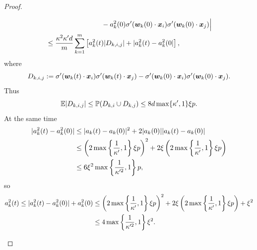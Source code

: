 \documentclass[twoside,11pt]{article}
\begin{document}
\begin{proof}
\begin{enumerate}[(a)]
\begin{enumerate}[(i)]
\begin{equation*}
\begin{aligned}
                                 & \quad\quad\quad\quad\quad\quad\quad\quad -a_k^2(0)\sigma'(\bm{w}_k(0)\cdot\bm{x}_i)\sigma'(\bm{w}_k(0)\cdot\bm{x}_j)\Big|                        \\
                                 & \leq \frac{\kappa^2\kappa'd}{m}\sum_{k=1}^m\left[a_k^2(t)\lvert D_{k,i,j}\rvert+|a_k^2(t)-a_k^2(0|\right],
                            \end{aligned}
                        \end{equation*}
                        where
                        \begin{equation*}
                            D_{k,i,j}:=\sigma'(\bm{w}_k(t)\cdot\bm{x}_i)\sigma'(\bm{w}_k(t)\cdot\bm{x}_j)-\sigma'(\bm{w}_k(0)\cdot\bm{x}_i)\sigma'(\bm{w}_k(0)\cdot\bm{x}_j).
                        \end{equation*}
                        Thus
                        \begin{equation*}
                            \mathbb{E}|D_{k,i,j}|\leq\mathbb{P}(D_{k,i}\cup D_{k,j})\leq 8d\max\{\kappa',1\}\xi p.
                        \end{equation*}
                        At the same time
                        \begin{equation*}
                            \begin{aligned}
                                \lvert a_k^2(t)-a_k^2(0)\rvert
                                 & \leq\lvert a_k(t)-a_k(0)\rvert^2+2\lvert a_k(0)\rvert\lvert a_k(t)-a_k(0)\rvert                                                                     \\
                                 & \leq \left(2\max\left\{\frac{1}{\kappa'},1\right\}\xi p\right)^2+2\xi\left(2\max\left\{\frac{1}{\kappa'},1\right\}\xi p\right) \\
                                 & \leq 6\xi^2\max\left\{\frac{1}{\kappa'^2},1\right\}p,
                            \end{aligned}
                        \end{equation*}
                        so
                        \begin{equation*}
                            \begin{aligned}
                                a_k^2(t)\leq \abs{a_k^2(t)-a_k^2(0)}+a_k^2(0)
                                 & \leq \left(2\max\left\{\frac{1}{\kappa'},1\right\}\xi p\right)^2+2\xi\left(2\max\left\{\frac{1}{\kappa'},1\right\}\xi p\right) + \xi^2 \\
                                 & \leq 4\max\left\{\frac{1}{\kappa'^2},1\right\}\xi^2.

\end{aligned}
\end{equation*}
\end{enumerate}
\end{enumerate}
\end{proof}
\end{document}
